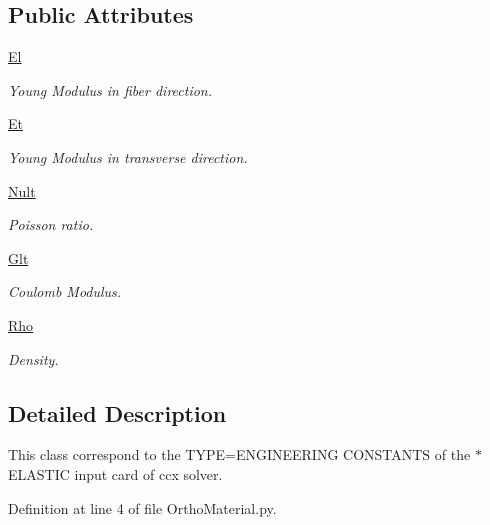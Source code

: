 \subsection*{Public Attributes}
\begin{DoxyCompactItemize}
\item 
\hyperlink{classgebtaero_1_1_ortho_material_1_1_ortho_material_a06886fe27a343441b7c49bf57ada36c2}{El}
\begin{DoxyCompactList}\small\item\em Young Modulus in fiber direction. \end{DoxyCompactList}\item 
\hyperlink{classgebtaero_1_1_ortho_material_1_1_ortho_material_a7c51660a08aa851b73bba6a7e0457be8}{Et}
\begin{DoxyCompactList}\small\item\em Young Modulus in transverse direction. \end{DoxyCompactList}\item 
\hyperlink{classgebtaero_1_1_ortho_material_1_1_ortho_material_adcae0796a5742c9467e24fe7370e6c32}{Nult}
\begin{DoxyCompactList}\small\item\em Poisson ratio. \end{DoxyCompactList}\item 
\hyperlink{classgebtaero_1_1_ortho_material_1_1_ortho_material_a0caf3d15efa1fef5bafed6e6c8d7a5b3}{Glt}
\begin{DoxyCompactList}\small\item\em Coulomb Modulus. \end{DoxyCompactList}\item 
\hyperlink{classgebtaero_1_1_ortho_material_1_1_ortho_material_aa1fa00a17cf09210c0daf5d7bbd07d0d}{Rho}
\begin{DoxyCompactList}\small\item\em Density. \end{DoxyCompactList}\end{DoxyCompactItemize}


\subsection{Detailed Description}
This class correspond to the T\+Y\+PE=E\+N\+G\+I\+N\+E\+E\+R\+I\+NG C\+O\+N\+S\+T\+A\+N\+TS of the $\ast$\+E\+L\+A\+S\+T\+IC input card of ccx solver. 

Definition at line 4 of file Ortho\+Material.\+py.



